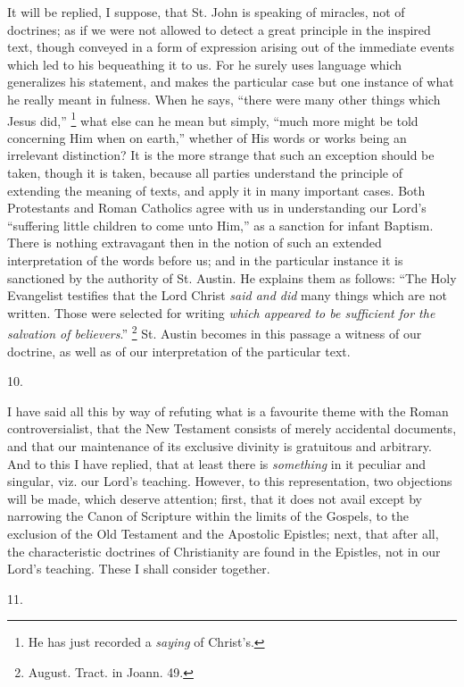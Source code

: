 It will be replied, I suppose, that St. John is speaking of
miracles, not of doctrines; as if we were not allowed to detect a
great principle in the inspired text, though conveyed in a form
of expression arising out of the immediate events which led to his
bequeathing it to us. For he surely uses language which generalizes
his statement, and makes the particular case but one instance of what
he really meant in fulness. When he says, ``there were many other
things which Jesus did,'' \footnote{He has just recorded a \emph{saying} of
Christ's.}
what else can he mean but simply, ``much more might be told
concerning Him when on earth,'' whether of His words or works
being an irrelevant distinction? It is the more strange that such an
exception should be taken, though it is taken, because all parties
understand the principle of extending the meaning of texts, and apply
it in many important cases. Both Protestants and Roman Catholics agree
with us in understanding our Lord's ``suffering little children to
come unto Him,'' as a sanction for infant Baptism. There is
nothing extravagant then in the notion of such an extended
interpretation of the words before us; and in the particular instance
it is sanctioned by the authority of St. Austin. He explains them as
follows: ``The Holy Evangelist testifies that the Lord Christ \emph{said
and did} many things which are not written. Those were selected for
writing \emph{which appeared to be sufficient for the salvation of
believers}.'' \footnote{August. Tract. in Joann. 49.} St.
Austin becomes in this passage a witness of our doctrine, as well as
of our interpretation of the particular text.

10.

I have said all this by way of refuting what is a favourite theme
with the Roman controversialist, that the New Testament consists of
merely accidental documents, and that our maintenance of its exclusive
divinity is gratuitous and arbitrary. And to this I have replied, that
at least there is \emph{something} in it peculiar and singular,
viz. our Lord's teaching. However, to this representation, two
objections will be made, which deserve attention; first, that it does
not avail except by narrowing the Canon of Scripture within the limits
of the Gospels, to the exclusion of the Old Testament and the
Apostolic Epistles; next, that after all, the characteristic doctrines
of Christianity are found in the Epistles, not in our Lord's teaching.
These I shall consider together.

11.

